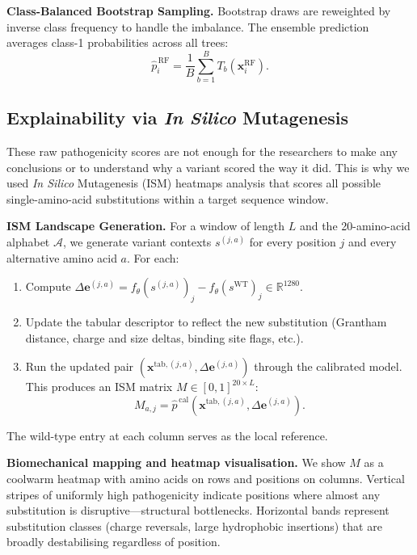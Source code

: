 \documentclass[conference]{IEEEtran}
\newcommand{\Deltaemb}{\Delta\mathbf{e}}
\begin{document}
\vspace{2mm}\noindent\textbf{Class-Balanced Bootstrap Sampling.}
Bootstrap draws are reweighted by inverse class frequency to handle the imbalance. The ensemble prediction averages class-1 probabilities across all trees:
\begin{equation}
  \hat{p}_i^{\,\mathrm{RF}} = \frac{1}{B}\sum_{b=1}^{B} T_b\!\left(\mathbf{x}_i^{\mathrm{RF}}\right).
  \label{eq:rf_pred}
\end{equation}

\subsection{Explainability via \textit{In Silico} Mutagenesis}

These raw pathogenicity scores are not enough for the researchers to make any conclusions or to understand why a variant scored the way it did. This is why we used \textit{In Silico} Mutagenesis (ISM) heatmaps analysis that scores all possible single-amino-acid substitutions within a target sequence window. 

\vspace{2mm}\noindent\textbf{ISM Landscape Generation.}
For a window of length $L$ and the 20-amino-acid alphabet $\mathcal{A}$, we generate variant contexts $s^{(j,a)}$ for every position $j$ and every alternative amino acid $a$. For each:
\begin{enumerate}
  \item Compute $\Deltaemb^{(j,a)} = f_\theta(s^{(j,a)})_j - f_\theta(s^{\mathrm{WT}})_j \in \mathbb{R}^{1280}$.
  \item Update the tabular descriptor to reflect the new substitution (Grantham distance, charge and size deltas, binding site flags, etc.).
  \item Run the updated pair $(\mathbf{x}^{\mathrm{tab},(j,a)}, \Deltaemb^{(j,a)})$ through the calibrated model. This produces an ISM matrix $M \in [0, 1]^{20\times L}$:
  \begin{equation}
    M_{a,j} = \hat{p}^{\,\mathrm{cal}}\!\left(\mathbf{x}^{\mathrm{tab},(j,a)}, \Deltaemb^{(j,a)}\right).
    \label{eq:ism_matrix}
  \end{equation}
\end{enumerate}
The wild-type entry at each column serves as the local reference. 

\vspace{2mm}\noindent\textbf{Biomechanical mapping and heatmap visualisation.}
We show $M$ as a coolwarm heatmap with amino acids on rows and positions on columns. Vertical stripes of uniformly high pathogenicity indicate positions where almost any substitution is disruptive---structural bottlenecks. Horizontal bands represent substitution classes (charge reversals, large hydrophobic insertions) that are broadly destabilising regardless of position.
\end{document}
